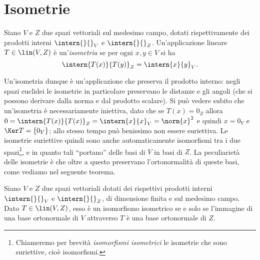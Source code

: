 \section{Isometrie} \label{sec:isometrie}
\begin{definizione} \label{d:isometria}
	Siano $V$ e $Z$ due spazi vettoriali sul medesimo campo, dotati rispettivamente dei prodotti interni $\intern{}{}_V$ e $\intern{}{}_Z$.
	Un'applicazione lineare $T\in\lin(V,Z)$ è un'\emph{isometria} se per ogni $  x,  y\in V$ si ha
	\begin{equation*}
		\intern{T(  x)}{T(  y)}_Z=\intern{  x}{  y}_V.
	\end{equation*}
\end{definizione}
Un'isometria dunque è un'applicazione che preserva il prodotto interno: negli spazi euclidei le isometrie in particolare preservano le distanze e gli angoli (che si possono derivare dalla norma e dal prodotto scalare).
Si può vedere subito che un'isometria è necessariamente iniettiva, dato che se $T(  x)=0_Z$ allora $0=\intern{T(  x)}{T(  x)}_Z=\intern{  x}{  x}_V=\norm{  x}^2$ e quindi $  x=0_V$ e $\Ker T=\{0_V\}$; allo stesso tempo può benissimo non essere suriettiva.
Le isometrie suriettive quindi sono anche automaticamente isomorfismi tra i due spazi\footnote{Chiameremo per brevità \emph{isomorfismi isometrici} le isometrie che sono suriettive, cioè isomorfismi.}, e in quanto tali ``portano'' delle basi di $V$ in basi di $Z$.
La peculiarietà delle isometrie è che oltre a questo preservano l'ortonormalità di queste basi, come vediamo nel seguente teorema.
\begin{teorema} \label{t:isometrie-basi-ortonormali}
	Siano $V$ e $Z$ due spazi vettoriali dotati dei rispettivi prodotti interni $\intern{}{}_V$ e $\intern{}{}_Z$, di dimensione finita e sul medesimo campo.
	Dato $T\in\lin(V,Z)$, esso è un isomorfismo isometrico se e solo se l'immagine di una base ortonormale di $V$ attraverso $T$ è una base ortonormale di $Z$.
\end{teorema}
